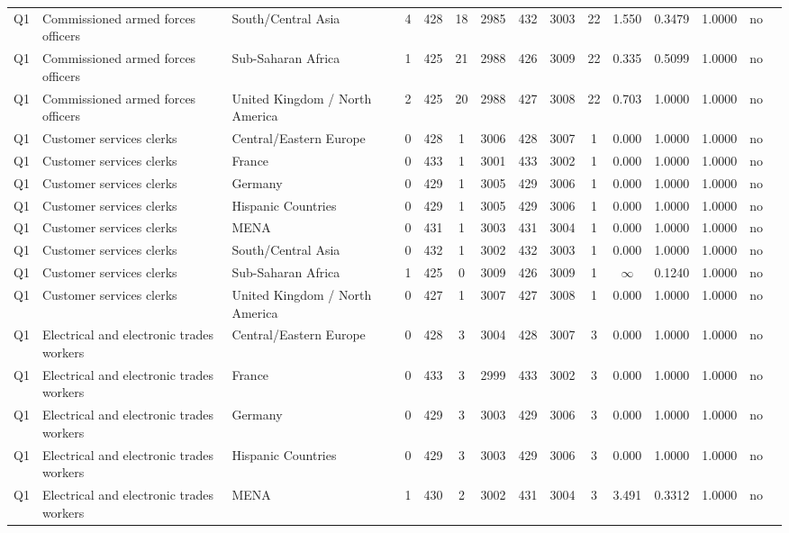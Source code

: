 \begin{longtable}{lllrcccccccccll}
Q1 & Commissioned armed forces officers & South/Central Asia & 4 & 428 & 18 & 2985 & 432 & 3003 & 22 & 1.550 & 0.3479 & 1.0000 & no \\
Q1 & Commissioned armed forces officers & Sub-Saharan Africa & 1 & 425 & 21 & 2988 & 426 & 3009 & 22 & 0.335 & 0.5099 & 1.0000 & no \\
Q1 & Commissioned armed forces officers & United Kingdom / North America & 2 & 425 & 20 & 2988 & 427 & 3008 & 22 & 0.703 & 1.0000 & 1.0000 & no \\
Q1 & Customer services clerks & Central/Eastern Europe & 0 & 428 & 1 & 3006 & 428 & 3007 & 1 & 0.000 & 1.0000 & 1.0000 & no \\
Q1 & Customer services clerks & France & 0 & 433 & 1 & 3001 & 433 & 3002 & 1 & 0.000 & 1.0000 & 1.0000 & no \\
Q1 & Customer services clerks & Germany & 0 & 429 & 1 & 3005 & 429 & 3006 & 1 & 0.000 & 1.0000 & 1.0000 & no \\
Q1 & Customer services clerks & Hispanic Countries & 0 & 429 & 1 & 3005 & 429 & 3006 & 1 & 0.000 & 1.0000 & 1.0000 & no \\
Q1 & Customer services clerks & MENA & 0 & 431 & 1 & 3003 & 431 & 3004 & 1 & 0.000 & 1.0000 & 1.0000 & no \\
Q1 & Customer services clerks & South/Central Asia & 0 & 432 & 1 & 3002 & 432 & 3003 & 1 & 0.000 & 1.0000 & 1.0000 & no \\
Q1 & Customer services clerks & Sub-Saharan Africa & 1 & 425 & 0 & 3009 & 426 & 3009 & 1 & $\infty$ & 0.1240 & 1.0000 & no \\
Q1 & Customer services clerks & United Kingdom / North America & 0 & 427 & 1 & 3007 & 427 & 3008 & 1 & 0.000 & 1.0000 & 1.0000 & no \\
Q1 & Electrical and electronic trades workers & Central/Eastern Europe & 0 & 428 & 3 & 3004 & 428 & 3007 & 3 & 0.000 & 1.0000 & 1.0000 & no \\
Q1 & Electrical and electronic trades workers & France & 0 & 433 & 3 & 2999 & 433 & 3002 & 3 & 0.000 & 1.0000 & 1.0000 & no \\
Q1 & Electrical and electronic trades workers & Germany & 0 & 429 & 3 & 3003 & 429 & 3006 & 3 & 0.000 & 1.0000 & 1.0000 & no \\
Q1 & Electrical and electronic trades workers & Hispanic Countries & 0 & 429 & 3 & 3003 & 429 & 3006 & 3 & 0.000 & 1.0000 & 1.0000 & no \\
Q1 & Electrical and electronic trades workers & MENA & 1 & 430 & 2 & 3002 & 431 & 3004 & 3 & 3.491 & 0.3312 & 1.0000 & no \\

\end{longtable}
